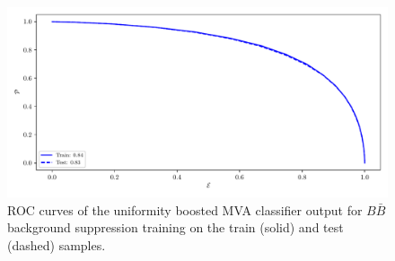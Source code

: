 \begin{figure}[!htb]
\centering
\captionsetup{width=0.8\linewidth}
\includegraphics[width=\linewidth]{fig/addendums/uBBcC_roc}
\caption{ROC curves of the uniformity boosted MVA classifier output for $B\bar B$ background suppression training on the train (solid) and test (dashed) samples.}
\end{figure}